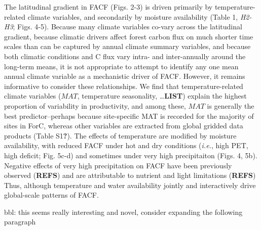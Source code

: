 \documentclass[]{article}
\begin{document}
The latitudinal gradient in FACF (Figs. 2-3) is driven primarily by
temperature-related climate variables, and secondarily by moisture
availability (Table 1, \emph{H2-H3}; Figs. 4-5). Because many climate
variables co-vary across the latitudinal gradient, because climatic
drivers affect forest carbon flux on much shorter time scales than can
be captured by annual climate summary variables, and because both
climatic conditions and C flux vary intra- and inter-annually around the
long-term means, it is not appropriate to attempt to identify any one
mean annual climate variable as a mechanistic driver of FACF. However,
it remains informative to consider these relationships. We find that
temperature-related climate variables (\(MAT\), temperature seasonality,
\ldots{}\textbf{LIST}) explain the highest proportion of variability in
productivity, and among these, \(MAT\) is generally the best
predictor--perhaps because site-specific MAT is recorded for the
majority of sites in ForC, whereas other variables are extracted from
global gridded data products (Table S1\textbf{?}). The effects of
temperature are modified by moisture availability, with reduced FACF
under hot and dry conditions (\emph{i.e.}, high PET, high deficit; Fig.
5c-d) and sometimes under very high precipitaiton (Figs. 4, 5b).
Negative effects of very high precipitation on FACF have been previously
observed (\textbf{REFS}) and are attributable to nutrient and light
limitations (\textbf{REFS}) Thus, although temperature and water
availability jointly and interactively drive global-scale patterns of
FACF.

bbl: this seems really interesting and novel, consider expanding the
following paragraph
\end{document}
